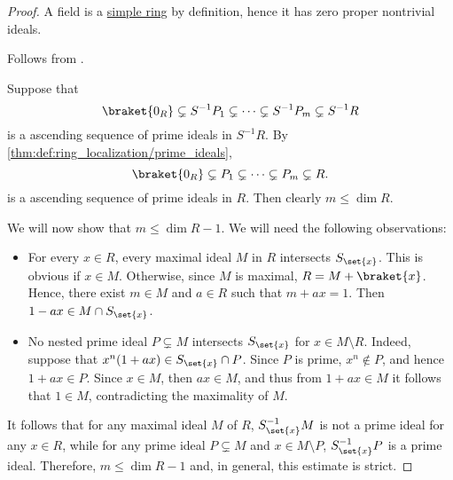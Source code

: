 \begin{proof}
   A field is a \hyperref[def:simple_object]{simple ring} by definition, hence it has zero proper nontrivial ideals.

   Follows from .

   Suppose that
  \begin{equation*}
    \braket{ 0_R } \subsetneq S^{-1} P_1 \subsetneq \cdots \subsetneq S^{-1} P_m \subsetneq S^{-1} R
  \end{equation*}
  is a ascending sequence of prime ideals in \( S^{-1} R \). By \cref{thm:def:ring_localization/prime_ideals},
  \begin{equation*}
    \braket{ 0_R } \subsetneq P_1 \subsetneq \cdots \subsetneq P_m \subsetneq R.
  \end{equation*}
  is a ascending sequence of prime ideals in \( R \). Then clearly \( m \leq \dim R \).

  We will now show that \( m \leq \dim R - 1 \). We will need the following observations:
  \begin{itemize}
    \item For every \( x \in R \), every maximal ideal \( M \) in \( R \) intersects \( S_{\set{ x }} \). This is obvious if \( x \in M \). Otherwise, since \( M \) is maximal, \( R = M + \braket{ x } \). Hence, there exist \( m \in M \) and \( a \in R \) such that \( m + ax = 1 \). Then \( 1 - ax \in M \cap S_{\set{ x }} \).

    \item No nested prime ideal \( P \subsetneq M \) intersects \( S_{\set{ x }} \) for \( x \in M \setminus R \). Indeed, suppose that \( x^n(1 + ax) \in S_{\set{ x }} \cap P \). Since \( P \) is prime, \( x^n \not\in P \), and hence \( 1 + ax \in P \). Since \( x \in M \), then \( ax \in M \), and thus from \( 1 + ax \in M \) it follows that \( 1 \in M \), contradicting the maximality of \( M \).
  \end{itemize}

  It follows that for any maximal ideal \( M \) of \( R \), \( S_{\set{ x }}^{-1} M \) is not a prime ideal for any \( x \in R \), while for any prime ideal \( P \subsetneq M \) and \( x \in M \setminus P \), \( S_{\set{ x }}^{-1} P \) is a prime ideal. Therefore, \( m \leq \dim R - 1 \) and, in general, this estimate is strict.



\end{proof}
